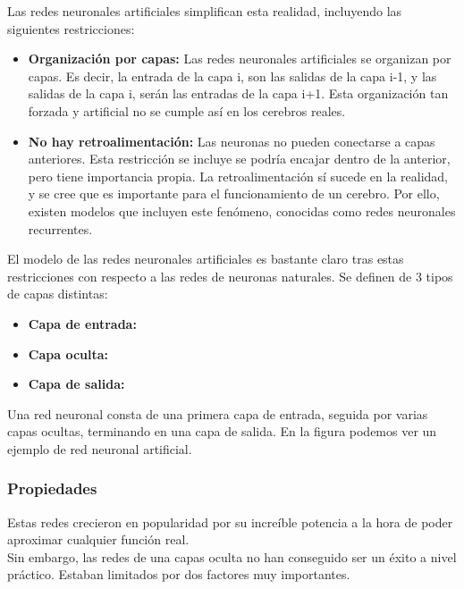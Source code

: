 Las redes neuronales artificiales simplifican esta realidad, incluyendo las siguientes restricciones:
\begin{itemize}
\item \textbf{Organización por capas:} Las redes neuronales artificiales se organizan por capas. Es decir, la entrada de la capa i, son las salidas de la capa i-1, y las salidas de la capa i, serán las entradas de la capa i+1. Esta organización tan forzada y artificial no se cumple así en los cerebros reales. 
\item \textbf{No hay retroalimentación:} Las neuronas no pueden conectarse a capas anteriores. Esta restricción se incluye se podría encajar dentro de la anterior, pero tiene importancia propia. La retroalimentación sí sucede en la realidad, y se cree que es importante para el funcionamiento de un cerebro. Por ello, existen modelos que incluyen este fenómeno, conocidas como redes neuronales recurrentes. 
\end{itemize}

El modelo de las redes neuronales artificiales es bastante claro tras estas restricciones con respecto a las redes de neuronas naturales. Se definen de 3 tipos de capas distintas:
\begin{itemize}
\item \textbf{Capa de entrada:}
\item \textbf{Capa oculta:}
\item \textbf{Capa de salida:}
\end{itemize}

Una red neuronal consta de una primera capa de entrada, seguida por varias capas ocultas, terminando en una capa de salida. En la figura  podemos ver un ejemplo de red neuronal artificial.\\

\subsubsection{Propiedades}

Estas redes crecieron en popularidad por su increíble potencia a la hora de poder aproximar cualquier función real. \\

Sin embargo, las redes de una capas oculta no han conseguido ser un éxito a nivel práctico. Estaban limitados por dos factores muy importantes. \\

